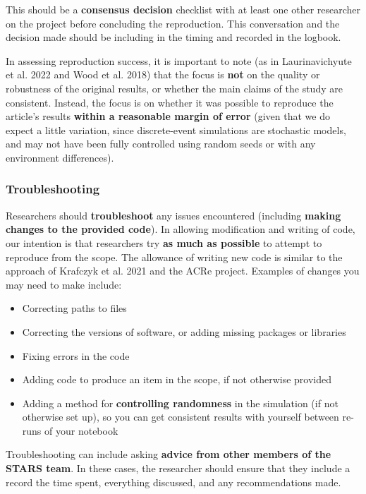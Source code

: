 This should be a \textbf{consensus decision} checklist with at least one other researcher on the project before concluding the reproduction. This conversation and the decision made should be including in the timing and recorded in the logbook.

In assessing reproduction success, it is important to note (as in Laurinavichyute et al. 2022\autocite{laurinavichyute_share_2022} and Wood et al. 2018\autocite{wood_push_2018}) that the focus is \textbf{not} on the quality or robustness of the original results, or whether the main claims of the study are consistent. Instead, the focus is on whether it was possible to reproduce the article's results \textbf{within a reasonable margin of error} (given that we do expect a little variation, since discrete-event simulations are stochastic models, and may not have been fully controlled using random seeds or with any environment differences).

\vspace{0.5cm}
\subsubsection{Troubleshooting}

Researchers should \textbf{troubleshoot} any issues encountered (including \textbf{making changes to the provided code}). In allowing modification and writing of code, our intention is that researchers try \textbf{as much as possible} to attempt to reproduce from the scope. The allowance of writing new code is similar to the approach of Krafczyk et al. 2021\autocite{krafczyk_learning_2021} and the ACRe project\autocite{berkeley_initiative_for_transparency_in_the_social_sciences_guide_2022}. Examples of changes you may need to make include:
\begin{itemize}
    \item Correcting paths to files
    \item Correcting the versions of software, or adding missing packages or libraries
    \item Fixing errors in the code
    \item Adding code to produce an item in the scope, if not otherwise provided
    \item Adding a method for \textbf{controlling randomness} in the simulation (if not otherwise set up), so you can get consistent results with yourself between re-runs of your notebook
\end{itemize}

Troubleshooting can include asking \textbf{advice from other members of the STARS team}. In these cases, the researcher should ensure that they include a record the time spent, everything discussed, and any recommendations made.

